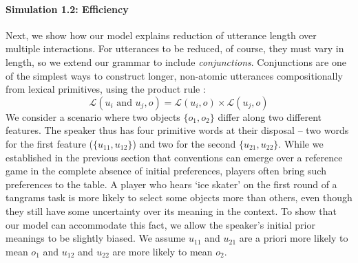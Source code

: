 \paragraph{Simulation 1.2: Efficiency}

Next, we show how our model explains reduction of utterance length over multiple interactions. 
For utterances to be reduced, of course, they must vary in length, so we extend our grammar to include \emph{conjunctions}. 
Conjunctions are one of the simplest ways to construct longer, non-atomic utterances compositionally from lexical primitives, using the product rule \cite<see also>[who instead consider negation]{SteinertThrelkeld16_CompositionalSignaling}:
$$\mathcal{L}(u_i \textrm{ and } u_j, o) = \mathcal{L}(u_i, o) \times \mathcal{L}(u_j, o)$$
We consider a scenario where two objects $\{o_1, o_2\}$ differ along two different features. 
The speaker thus has four primitive words at their disposal -- two words for the first feature ($\{u_{11}, u_{12}\}$) and two for the second $\{u_{21}, u_{22}\}$. 
While we established in the previous section that conventions can emerge over a reference game in the complete absence of initial preferences, players often bring such preferences to the table. 
A player who hears `ice skater' on the first round of a tangrams task is more likely to select some objects more than others, even though they still have some uncertainty over its meaning in the context. 
To show that our model can accommodate this fact, we allow the speaker's initial prior meanings to be slightly biased. 
We assume $u_{11}$ and $u_{21}$ are a priori more likely to mean $o_1$ and $u_{12}$ and $u_{22}$ are more likely to mean $o_2$.

